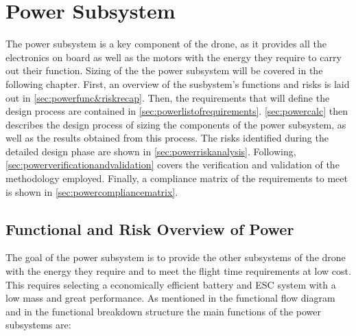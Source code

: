 \chapter{Power Subsystem}
\label{ch:power}

The power subsystem is a key component of the drone, as it provides all the electronics on board as well as the motors with the energy they require to carry out their function. Sizing of the the power subsystem will be covered in the following chapter. First, an overview of the susbystem's functions and risks is laid out in \autoref{sec:powerfunc&riskrecap}. Then, the requirements that will define the design process are contained in \autoref{sec:powerlistofrequirements}. \autoref{sec:powercalc} then describes the design process of sizing the components of the power subsystem, as well as the results obtained from this process. The risks identified during the detailed design phase are shown in \autoref{sec:powerriskanalysis}. Following, \autoref{sec:powerverificationandvalidation} covers the verification and validation of the methodology employed. Finally, a compliance matrix of the requirements to meet is shown in \autoref{sec:powercompliancematrix}.



\section{Functional and Risk Overview of Power}
\label{sec:powerfunc&riskrecap}

The goal of the power subsystem is to provide the other subsystems of the drone with the energy they require and to meet the flight time requirements at low cost. This requires selecting a economically efficient battery and ESC system with a low mass and great performance. As mentioned in the functional flow diagram and in the functional breakdown structure the main functions of the power subsystems are:




